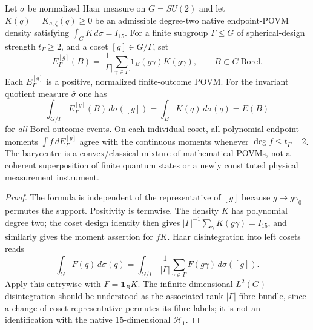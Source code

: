 \documentclass[11pt,a4paper]{article}
\begin{document}
\begin{theorem}
\label{p2f:thm:v273-finite-fibre-povm-barycentre}
Let $\sigma$ be normalized Haar measure on $G=SU(2)$ and let
$K(q)=K_{a,\zeta}(q)\ge0$ be an admissible degree-two
native endpoint-POVM density satisfying $\int_GK\,d\sigma=I_{15}$.
For a finite subgroup $\Gamma\le G$ of spherical-design strength
$t_\Gamma\ge2$, and a coset $[g]\in G/\Gamma$, set
\[
 E^{[g]}_\Gamma(B)=\frac1{|\Gamma|}\sum_{\gamma\in\Gamma}
              \mathbf1_B(g\gamma)K(g\gamma),\qquad B\subset G
              \ \text{Borel}.
\]
Each $E^{[g]}_\Gamma$ is a positive, normalized finite-outcome POVM.
For the invariant quotient measure $\bar\sigma$ one has
\[
 \boxed{\int_{G/\Gamma}E^{[g]}_\Gamma(B)
              \,d\bar\sigma([g])
       =\int_BK(q)\,d\sigma(q)=E(B)}
\]
for \emph{all} Borel outcome events. On each individual coset,
all polynomial endpoint moments $\int f\,dE^{[g]}_\Gamma$ agree with
the continuous moments whenever $\deg f\le t_\Gamma-2$.
The barycentre is a convex/classical mixture of mathematical POVMs,
not a coherent superposition of finite quantum states or a newly
constituted physical measurement instrument.
\end{theorem}
\begin{proof}
The formula is independent of the representative of $[g]$ because
$g\mapsto g\gamma_0$ permutes the support. Positivity is termwise.
The density $K$ has polynomial degree two; the coset design identity
then gives $|\Gamma|^{-1}\sum_\gamma K(g\gamma)=I_{15}$,
and similarly gives the moment assertion for $fK$.
Haar disintegration into left cosets reads
\[
 \int_GF(q)\,d\sigma(q)=\int_{G/\Gamma}
  \frac1{|\Gamma|}\sum_{\gamma\in\Gamma}F(g\gamma)
  \,d\bar\sigma([g]).
\]
Apply this entrywise with $F=\mathbf1_BK$. The infinite-dimensional
$L^2(G)$ disintegration should be understood as the associated
rank-$|\Gamma|$ fibre bundle, since a change of coset representative
permutes its fibre labels; it is not an identification with the native
15-dimensional $\mathcal H_1$.
\end{proof}
\end{document}
